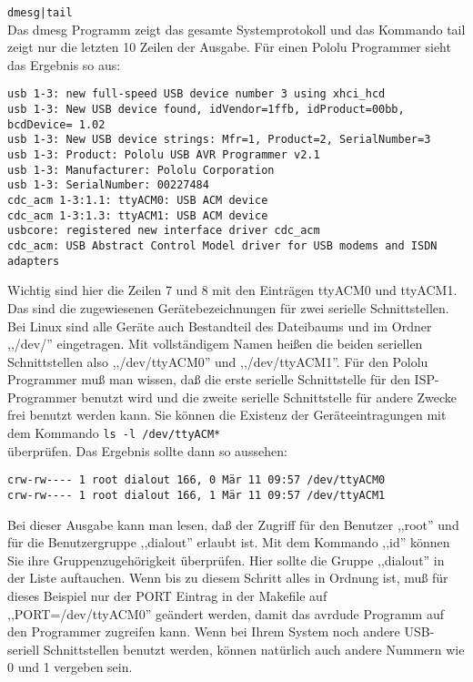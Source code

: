 \verb"dmesg|tail"\\
Das dmesg Programm zeigt das gesamte Systemprotokoll und das Kommando 
tail zeigt nur die letzten 10 Zeilen der Ausgabe.
Für einen Pololu Programmer sieht das Ergebnis so aus:
\begin{footnotesize}
\begin{verbatim}
usb 1-3: new full-speed USB device number 3 using xhci_hcd
usb 1-3: New USB device found, idVendor=1ffb, idProduct=00bb, bcdDevice= 1.02
usb 1-3: New USB device strings: Mfr=1, Product=2, SerialNumber=3
usb 1-3: Product: Pololu USB AVR Programmer v2.1
usb 1-3: Manufacturer: Pololu Corporation
usb 1-3: SerialNumber: 00227484
cdc_acm 1-3:1.1: ttyACM0: USB ACM device
cdc_acm 1-3:1.3: ttyACM1: USB ACM device
usbcore: registered new interface driver cdc_acm
cdc_acm: USB Abstract Control Model driver for USB modems and ISDN adapters
\end{verbatim}
\end{footnotesize}
Wichtig sind hier die Zeilen 7 und 8 mit den Einträgen ttyACM0 und ttyACM1.
Das sind die zugewiesenen Gerätebezeichnungen für zwei serielle Schnittstellen.
Bei Linux sind alle Geräte auch Bestandteil des Dateibaums und im
Ordner ,,/dev/'' eingetragen. Mit vollständigem Namen heißen die
beiden seriellen Schnittstellen also ,,/dev/ttyACM0'' und ,,/dev/ttyACM1''.
Für den Pololu Programmer muß man wissen, daß die erste serielle Schnittstelle
für den ISP-Programmer benutzt wird und die zweite serielle Schnittstelle
für andere Zwecke frei benutzt werden kann.
Sie können die Existenz der Geräteeintragungen mit dem Kommando
\verb"ls -l /dev/ttyACM*"\\
überprüfen. Das Ergebnis sollte dann so aussehen:
\begin{footnotesize}
\begin{verbatim}
crw-rw---- 1 root dialout 166, 0 Mär 11 09:57 /dev/ttyACM0
crw-rw---- 1 root dialout 166, 1 Mär 11 09:57 /dev/ttyACM1
\end{verbatim}
\end{footnotesize}
Bei dieser Ausgabe kann man lesen, daß der Zugriff für den Benutzer ,,root''
und für die Benutzergruppe ,,dialout'' erlaubt ist.
Mit dem Kommando ,,id'' können Sie ihre Gruppenzugehörigkeit überprüfen.
Hier sollte die Gruppe ,,dialout'' in der Liste auftauchen.
Wenn bis zu diesem Schritt alles in Ordnung ist,
muß für dieses Beispiel nur der PORT Eintrag in der Makefile auf
,,PORT=/dev/ttyACM0'' geändert werden,
damit das avrdude Programm auf den Programmer zugreifen kann.
Wenn bei Ihrem System noch andere USB-seriell Schnittstellen benutzt
werden, können natürlich auch andere Nummern wie 0 und 1 vergeben sein.\\


